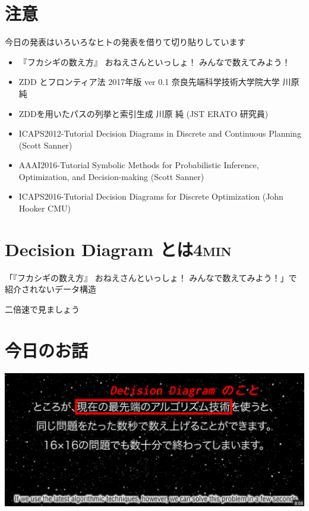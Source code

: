 \begin{outline-text-1}
\end{outline-text-1}

\section{注意}
\label{sec-1}

今日の発表はいろいろなヒトの発表を借りて切り貼りしています

\begin{itemize}
\item 『フカシギの数え方』 おねえさんといっしょ！ みんなで数えてみよう！
\item ZDD とフロンティア法 2017年版 ver 0.1 奈良先端科学技術大学院大学 川原 純
\item ZDDを用いたパスの列挙と索引生成 川原 純 (JST ERATO 研究員)
\item ICAPS2012-Tutorial Decision Diagrams in Discrete and Continuous Planning (Scott Sanner)
\item AAAI2016-Tutorial  Symbolic Methods for Probabilistic Inference, Optimization, and Decision-making (Scott Sanner)
\item ICAPS2016-Tutorial Decision Diagrams for Discrete Optimization (John Hooker CMU)
\end{itemize}

\section[Decision Diagram とは]{Decision Diagram とは\hfill{}\textsc{4min}}
\label{sec-2}

「『フカシギの数え方』 おねえさんといっしょ！ みんなで数えてみよう！」で紹介されないデータ構造

二倍速で見ましょう

\section{今日のお話}
\label{sec-3}

\includegraphics{img/static/latest-tech.png}

